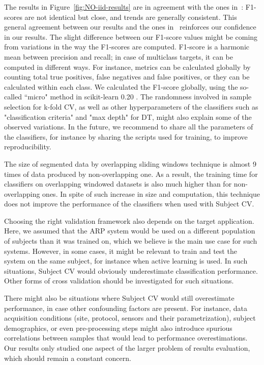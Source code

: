 \documentclass[sigconf]{acmart}
\begin{document}
The results in Figure~\ref{fig:NO-iid-results} are in agreement with the ones 
in~\cite{banos2014window}: F1-scores are not identical but close, 
and trends are generally consistent. This general agreement between our results 
and the ones in~\cite{banos2014window} reinforces our confidence in our 
results. The slight difference between our F1-score values might be 
coming from variations in the way the F1-scores are computed. F1-score 
is a harmonic mean between precision and recall; in case of multiclass 
targets, it can be computed in different ways. For instance, metrics 
can be calculated globally by counting total true positives, false 
negatives and false positives, or they can be calculated within each 
class. We calculated the F1-score globally, using the so-called ``micro" 
method in scikit-learn 0.20 \cite{pedregosa2011scikit}. The randomness 
involved in sample selection for k-fold CV, as well as other 
hyperparameters of the classifiers such as "classification criteria" and "max depth" for DT, might also explain 
some of the observed variations. In the future, we recommend to share all the parameters of the classifiers, for instance by sharing the scripts used for training, to improve reproducibility.

The size of segmented data by overlapping sliding windows technique is almost 9 times of data produced by non-overlapping one. As a result, the training time for classifiers on overlapping windowed datasets is also much higher than for non-overlapping ones. In spite of such increase in size and computation, this technique does not improve the performance of the classifiers when used with Subject CV. 

Choosing the right validation framework also depends on the target 
application. Here, we assumed that the ARP system would be used on a 
different population of subjects than it was trained on, which we believe
is the main use case for such systems. However, in some cases, it might
be relevant to train and test the system on the same subject, for instance
when active learning is used. In such situations, Subject CV would
obviously underestimate classification performance. Other forms of cross validation should be investigated for such situations. 

There might also be situations where Subject CV would still 
overestimate performance, in case other confounding factors are present.
For instance, data acquisition conditions (site, protocol, sensors and 
their parametrization), subject demographics, or even pre-processing 
steps might also introduce spurious correlations between samples that 
would lead to performance overestimations. Our results only studied one 
aspect of the larger problem of results evaluation, which should remain 
a constant concern.
\end{document}

